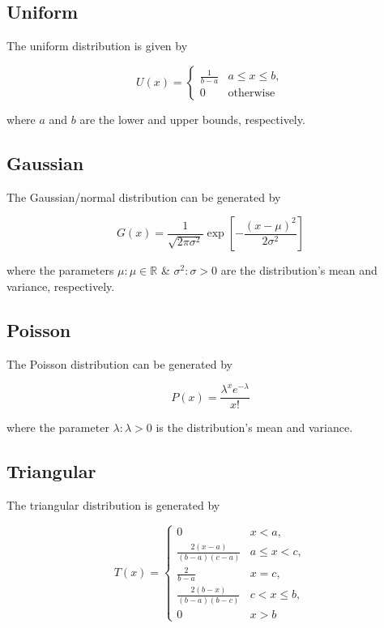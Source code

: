 \subsection{Uniform}
\label{ssec:random-distro-uniform}
The uniform distribution is given by

\begin{equation}
	\label{eq:random-uniform}
	U(x) = \begin{cases}
		\frac{1}{b - a} & a \leq x \leq b, \\
		0 & \mathrm{otherwise}
	\end{cases}
\end{equation}

\noindent where $a$ and $b$ are the lower and upper bounds, respectively.

\subsection{Gaussian}
\label{ssec:random-distro-gaussian}
The Gaussian/normal distribution can be generated by

\begin{equation}
	\label{eq:random-gaussian}
	G(x) = \frac{1}{\sqrt{2\pi\sigma^2}} \exp[-\frac{(x - \mu)^2}{2\sigma^2}]
\end{equation}

\noindent where the parameters $\mu: \mu \in \mathbb{R}$ \& $\sigma^2: \sigma > 0$ are the distribution's mean and variance, respectively.

\subsection{Poisson}
\label{ssec:random-distro-poisson}
The Poisson distribution can be generated by

\begin{equation}
	\label{eq:random-poisson}
	P(x) = \frac{\lambda^x e^{-\lambda}}{x!}
\end{equation}

\noindent where the parameter $\lambda: \lambda > 0$ is the distribution's mean and variance.

\subsection{Triangular}
\label{ssec:random-distro-triangular}
The triangular distribution is generated by

\begin{equation}
	\label{eq:random-triangular}
	T(x) = \begin{cases}
		0 & x < a, \\
		\frac{2(x-a)}{(b - a)(c - a)} & a \leq x < c, \\
		\frac{2}{b - a} & x = c, \\
		\frac{2(b - x)}{(b - a)(b - c)} & c < x \leq b, \\
		0 & x > b
	\end{cases}
\end{equation}

